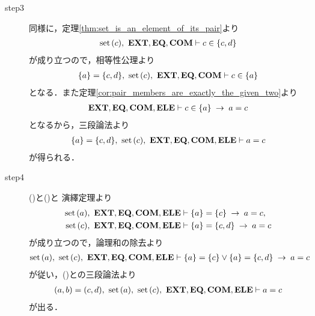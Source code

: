 \begin{sketch}
\begin{description}
			\item[step3] 同様に，定理\ref{thm:set_is_an_element_of_its_pair}より
				\begin{align}
					\operatorname*{set}\hspace{0.15em}(c),\ \mbox{{\bf EXT}},\mbox{{\bf EQ}},\mbox{\bf COM} \vdash c \in \{c,d\}
				\end{align}
				が成り立つので，相等性公理より
				\begin{align}
					\{a\} = \{c,d\},\ \operatorname*{set}\hspace{0.15em}(c),\ \mbox{{\bf EXT}},\mbox{{\bf EQ}},\mbox{\bf COM} \vdash c \in \{a\}
				\end{align}
				となる．また定理\ref{cor:pair_members_are_exactly_the_given_two}より
				\begin{align}
					\mbox{{\bf EXT}},\mbox{{\bf EQ}},\mbox{\bf COM},\mbox{{\bf ELE}} \vdash c \in \{a\} \hspace{0.25em}\rightarrow\hspace{0.25em} a = c
				\end{align}
				となるから，三段論法より
				\begin{align}
					\{a\} = \{c,d\},\ \set{c},\ \EXTAX,\EQAX,\COMAX,\ELEAX \vdash a = c
					\label{fom:equality_of_ordered_pairs_4}
				\end{align}
				が得られる．
				
			\item[step4] ()と()と
				演繹定理より
				\begin{align}
					\operatorname*{set}\hspace{0.15em}(a),\ \mbox{{\bf EXT}},\mbox{{\bf EQ}},\mbox{\bf COM},\mbox{{\bf ELE}} &\vdash \{a\} = \{c\} \hspace{0.25em}\rightarrow\hspace{0.25em} a = c, \\
					\operatorname*{set}\hspace{0.15em}(c),\ \mbox{{\bf EXT}},\mbox{{\bf EQ}},\mbox{\bf COM},\mbox{{\bf ELE}} &\vdash \{a\} = \{c,d\} \hspace{0.25em}\rightarrow\hspace{0.25em} a = c
				\end{align}
				が成り立つので，論理和の除去より
				\begin{align}
					\operatorname*{set}\hspace{0.15em}(a),\ \operatorname*{set}\hspace{0.15em}(c),\ \mbox{{\bf EXT}},\mbox{{\bf EQ}},\mbox{\bf COM},\mbox{{\bf ELE}} \vdash 
					\{a\} = \{c\} \vee \{a\} = \{c,d\} \hspace{0.25em}\rightarrow\hspace{0.25em} a = c
				\end{align}
				が従い，()との三段論法より
				\begin{align}
					(a,b) = (c,d),\ \set{a},\ \set{c},\ \EXTAX,\EQAX,\COMAX,\ELEAX \vdash a = c
				\end{align}
				が出る．
				

\end{description}
\end{sketch}
